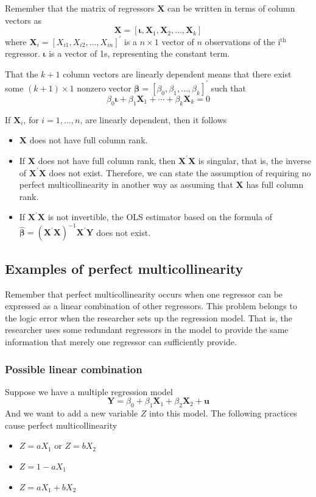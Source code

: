 \documentclass[a4paper,11pt]{article}
\begin{document}
Remember that the matrix of regressors \(\mathbf{X}\) can be written in
terms of column vectors as
\[
\mathbf{X} = [\boldsymbol{\iota}, \mathbf{X}_1, \mathbf{X}_2, \ldots, \mathbf{X}_k ]
\]
where \(\mathbf{X}_i = [X_{i1}, X_{i2}, \ldots, X_{in}]^{\prime}\)
is a \(n \times 1\) vector of \(n\) observations of the i\(^{\text{th}}\)
regressor. \(\boldsymbol{\iota}\) is a vector of 1s, representing the
constant term.

That the \(k+1\) column vectors are linearly dependent means that there
exist some \((k+1) \times 1\) nonzero vector \(\boldsymbol{\beta} =
[\beta_0, \beta_1, \ldots, \beta_k]^{\prime}\) such that
\[
\beta_0 \boldsymbol{\iota} + \beta_1 \mathbf{X}_1 + \cdots + \beta_k
\mathbf{X}_k = 0 \]

If \(\mathbf{X}_i\), for \(i=1,\ldots,n\), are linearly dependent,
then it follows
\begin{itemize}
\item \(\mathbf{X}\) does not have full column rank.
\item If \(\mathbf{X}\) does not have full column rank, then
\(\mathbf{X}^{\prime} \mathbf{X}\) is singular, that is, the inverse
of \(\mathbf{X}^{\prime} \mathbf{X}\) does not exist. Therefore, we
can state the assumption of requiring no perfect multicollinearity
in another way as assuming that \(\mathbf{X}\) has full column rank.
\item If \(\mathbf{X}^{\prime} \mathbf{X}\) is not invertible, the OLS
estimator based on the formula of \(\boldsymbol{\hat{\beta}} =
  (\mathbf{X}^{\prime} \mathbf{X})^{-1} \mathbf{X}^{\prime}
  \mathbf{Y}\) does not exist.
\end{itemize}


\subsection{Examples of perfect multicollinearity}
\label{sec:org7ae4403}

Remember that perfect multicollinearity occurs when one regressor can
be expressed as a linear combination of other regressors. This problem
belongs to the logic error when the researcher sets up the regression
model. That is, the researcher uses some redundant regressors in the
model to provide the same information that merely one regressor can
sufficiently provide.

\subsubsection*{Possible linear combination}
\label{sec:org7e4a789}
Suppose we have a multiple regression model
\[ \mathbf{Y} = \beta_0 + \beta_1 \mathbf{X}_1 + \beta_2
\mathbf{X}_2 + \mathbf{u}  \]
And we want to add a new variable \(Z\) into this model. The following
practices cause perfect multicollinearity
\begin{itemize}
\item \(Z = a X_1\) or \(Z = b X_2\)
\item \(Z = 1 - a X_1\)
\item \(Z = a X_1 + b X_2\)
\end{itemize}
\end{document}
